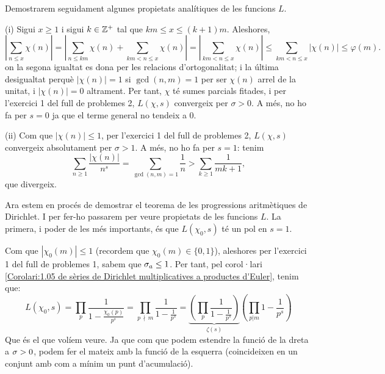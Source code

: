 Demostrarem seguidament algunes propietats analítiques de les funcions $L$. 
\begin{pf}
    (i) Sigui $x \geq 1$ i sigui $k \in \mathbb Z^+$ tal que $km \leq x \leq (k+1)m$. Aleshores, 
    \[
        \left|\sum_{n \leq x} \chi(n)\right| = \left|\sum_{n \leq km} \chi(n) + \sum_{km < n \leq x} \chi(n)\right| =
        \left|\sum_{km < n \leq x} \chi(n)\right| \leq \sum_{km < n \leq x} |\chi(n)| \leq \varphi(m).
    \]
    on la segona igualtat es dona per les relacions d'ortogonalitat; i la última desigualtat perquè $|\chi(n)| = 1$ si $\gcd(n, m) = 1$ per ser $\chi(n)$ arrel de 
    la unitat, i $|\chi(n)| = 0$ altrament. Per tant, $\chi$ té sumes parcials fitades, i per l'exercici 1 del full de problemes 2, $L(\chi, s)$ convergeix per 
    $\sigma > 0$. A més, no ho fa per $s=0$ ja que el terme general no tendeix a 0.

    (ii) Com que $|\chi(n)| \leq 1$, per l'exercici 1 del full de problemes 2, $L(\chi, s)$ convergeix absolutament per $\sigma > 1$. A més, no ho fa per $s = 1$: 
    tenim 
    \[
    \sum_{n \geq 1} \frac{|\chi(n)|}{n^s} = \sum_{\gcd(n, m) = 1} \frac{1}{n}>\sum_{k\geq1}\frac{1}{mk+1},
    \]
    que divergeix.
\end{pf}
Ara estem en procés de demostrar el teorema de les progressions aritmètiques de Dirichlet. I per fer-ho passarem per veure propietats de les funcions $L$. La 
primera, i poder de les més importants, és que $L(\chi_0,s)$ té un pol en $s=1$.
\begin{pf}
    Com que $|\chi_0(m)|\leq1$ (recordem que $\chi_0(m)\in\{0,1\}$), aleshores per l'exercici 1 del full de problemes 1, sabem que $\sigma_a\leq1$. Per tant, pel corol·lari
    \ref{Corolari:1.05 de sèries de Dirichlet multiplicatives a productes d'Euler}, tenim que:
    \[
    L(\chi_0,s)=\prod_p \frac{1}{1-\frac{\chi_0(p)}{p^s}}=\prod_{p\,\nmid \,m}\frac{1}{1-\frac{1}{p^s}}=
    \underbrace{\left(\prod_p\frac{1}{1-\frac{1}{p^s}}\right)}_{\zeta(s)}\left(\prod_{p|m}1-\frac{1}{p^s}\right)
    \]
    Que és el que volíem veure. Ja que com que podem estendre la funció de la dreta a $\sigma>0$, podem fer el mateix amb la funció de la esquerra (coincideixen en un conjunt amb com a mínim un punt d'acumulació).
\end{pf}
